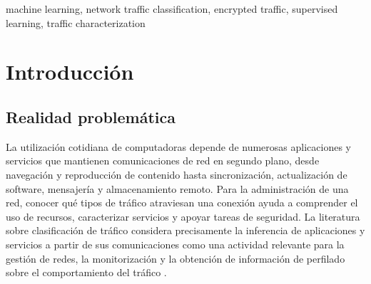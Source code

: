 \documentclass[conference]{IEEEtran}
\begin{document}
\vspace{0.5em}

\renewcommand{\abstractname}{Abstract}
\begin{abstract}
\foreignlanguage{english}{The growing share of encrypted network traffic limits the usefulness of classification methods based on static ports or direct content inspection. This work proposes a supervised machine learning system to classify and characterize network traffic from observable flow features, along two dimensions of analysis: classification by application or service type, and security-oriented characterization. The system is designed as a web application with an inference API, trained on labeled public datasets. Two independent experiments are reported: binary security classification on CICIDS2017, where Random Forest reached a 98.16\,\% test macro-F1 without port information (with 98 undetected attacks), and seven-class application classification on ISCXVPN2016, where Gradient Boosting reached an 86.24\,\% macro-F1. Prediction aggregation over the test sets was verified locally; cloud deployment and the self-collected capture remain pending. The identification, generalization, and security-interpretation limits of the proposed system are explicitly documented.}
\end{abstract}

\renewcommand{\IEEEkeywordsname}{Keywords}
\begin{IEEEkeywords}
machine learning, network traffic classification, encrypted traffic, supervised learning, traffic characterization
\end{IEEEkeywords}

\section{Introducción}

\subsection{Realidad problemática}

La utilización cotidiana de computadoras depende de numerosas aplicaciones y servicios que mantienen comunicaciones de red en segundo plano, desde navegación y reproducción de contenido hasta sincronización, actualización de software, mensajería y almacenamiento remoto. Para la administración de una red, conocer qué tipos de tráfico atraviesan una conexión ayuda a comprender el uso de recursos, caracterizar servicios y apoyar tareas de seguridad. La literatura sobre clasificación de tráfico considera precisamente la inferencia de aplicaciones y servicios a partir de sus comunicaciones como una actividad relevante para la gestión de redes, la monitorización y la obtención de información de perfilado sobre el comportamiento del tráfico \cite{shen2023,aceto2021}.
\end{document}
